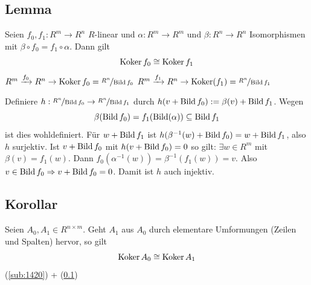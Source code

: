 \subsection[Lemma über die Kokerne zweier $R$-linearen Abbildungen]{Lemma} %
\label{sub:1421}
Seien $f_0, f_1 : R^m \to R^n$ $R$-linear und $\alpha : R^m  \to R^m$ und $\beta : R^n \to R^n$ Isomorphismen mit $\beta \circ  f_0 = f_1 \circ \alpha$. Dann gilt
\[
	\operatorname{Koker} f_0 \cong \operatorname{Koker} f_1
\]
$R^m \xrightarrow{f_0} R^n \to \operatorname{Koker} f_0 = \nicefrac{R^n}{\operatorname{Bild} f_0} $ $R^m \xrightarrow{f_1} R^n \to \operatorname{Koker} (f_1) = \nicefrac{R^n}{\operatorname{Bild} f_1} $
\begin{figure}[ht]
\end{figure}
Definiere $h : \nicefrac{R^n}{\operatorname{Bild} f_0} \to \nicefrac{R^n}{\operatorname{Bild} f_1}$ durch $h(v+ \operatorname{Bild} f_0) := \beta(v) + \operatorname{Bild} f_1$. Wegen 
\[
	\beta(\operatorname{Bild} f_0) = f_1 (\operatorname{Bild} (\alpha)) \subseteq \operatorname{Bild} f_1
\]
ist dies wohldefiniert. Für $w+ \operatorname{Bild} f_1$ ist $h ( \beta ^{-1} (w) + \operatorname{Bild} f_0) = w + \operatorname{Bild} f_1$, also $h$ surjektiv. Ist $v+ \operatorname{Bild} f_0$ mit $h(v+ \operatorname{Bild} f_0) = 0$
so gilt: $\exists w \in R^m$ mit $\beta(v)= f_1 (w)$. Dann $f_0 ( \alpha ^{-1} (w)) = \beta ^{-1} ( f_1 (w)) = v$. Also $v \in \operatorname{Bild} f_0 \Rightarrow v+ \operatorname{Bild} f_0 = 0$.
Damit ist $h$ auch injektiv. \bewende

\subsection[Korollar: Die Kokerne zweier Matrizen, die auseinander hervorgehen, sind isomorph]{Korollar} %
\label{sub:1422}
Seien $A_0, A_1 \in R^{n \times m}$. Geht $A_1$ aus $A_0$ durch elementare Umformungen (Zeilen und Spalten) hervor, so gilt 
\[
	\operatorname{Koker} A_0 \cong \operatorname{Koker} A_1
\]
(\ref{sub:1420}) + (\ref{sub:1421}) \bewende


